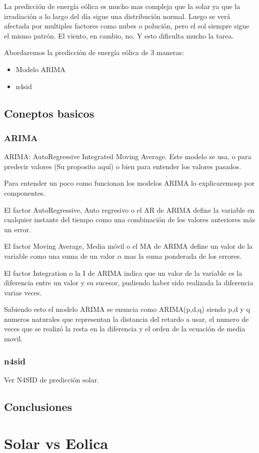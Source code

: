 La predicción de energía eólica es mucho mas compleja que la solar ya que la irradiación a lo largo del día sigue una distribución normal. Luego se verá afectada por multiples factores como nubes o polución, pero el sol siempre sigue el mismo patrón. El viento, en cambio, no. Y esto dificulta mucho la tarea.

Abordaremos la predicción de energía eólica de 3 maneras:
\begin{itemize}
	\item Modelo ARIMA
	\item n4sid
\end{itemize}

\subsection{Coneptos basicos} 
\label{sub:coneptos_basicos}

\subsubsection{ARIMA}
\label{ssub:arima}

ARIMA: AutoRegressive Integrated Moving Average. Este modelo se usa, o para predecir valores (Su proposito aquí) o bien para entender los valores pasados.

Para entender un poco como funcionan los modelos ARIMA lo explicaremosp por componentes.

El factor AutoRegressive, Auto regresivo o el AR de ARIMA define la variable en cualquier instante del tiempo como una combinación de los valores anteriores más un error.

El factor Moving Average, Media móvil o el MA de ARIMA define un valor de la variable como una suma de un valor $\alpha$ mas la suma ponderada de los errores.

El factor Integration o la I de ARIMA indica que un valor de la variable es la diferencia entre un valor y su sucesor, pudiendo haber sido realizada la diferencia varias veces.

Sabiendo esto el modelo ARIMA se enuncia como ARIMA(p,d,q) siendo p,d y q numeros naturales que representan la distancia del retardo a usar, el numero de veces que se realizó la resta en la diferencia y el orden de la ecuación de media movil.


\subsubsection{n4sid}
\label{ssub:n4sid}

Ver N4SID de predicción solar.



\subsection{Conclusiones} 
\label{sub:conclusiones}



\section{Solar vs Eolica} 
\label{sec:solar_vs_eolica}




